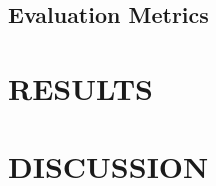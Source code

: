 \documentclass{article}
\begin{document}
\subsection{Evaluation Metrics}
















\section{RESULTS}
\label{sec:pagestyle}


\section{DISCUSSION}
\label{sec:typestyle}




\end{document}
